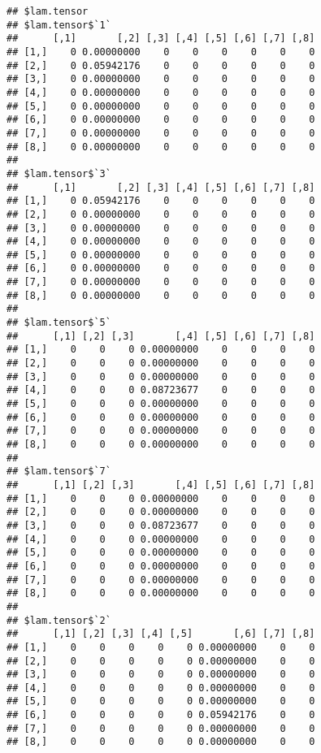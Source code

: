 \documentclass[
]{article}
\begin{document}
\begin{verbatim}
## $lam.tensor
## $lam.tensor$`1`
##      [,1]       [,2] [,3] [,4] [,5] [,6] [,7] [,8]
## [1,]    0 0.00000000    0    0    0    0    0    0
## [2,]    0 0.05942176    0    0    0    0    0    0
## [3,]    0 0.00000000    0    0    0    0    0    0
## [4,]    0 0.00000000    0    0    0    0    0    0
## [5,]    0 0.00000000    0    0    0    0    0    0
## [6,]    0 0.00000000    0    0    0    0    0    0
## [7,]    0 0.00000000    0    0    0    0    0    0
## [8,]    0 0.00000000    0    0    0    0    0    0
## 
## $lam.tensor$`3`
##      [,1]       [,2] [,3] [,4] [,5] [,6] [,7] [,8]
## [1,]    0 0.05942176    0    0    0    0    0    0
## [2,]    0 0.00000000    0    0    0    0    0    0
## [3,]    0 0.00000000    0    0    0    0    0    0
## [4,]    0 0.00000000    0    0    0    0    0    0
## [5,]    0 0.00000000    0    0    0    0    0    0
## [6,]    0 0.00000000    0    0    0    0    0    0
## [7,]    0 0.00000000    0    0    0    0    0    0
## [8,]    0 0.00000000    0    0    0    0    0    0
## 
## $lam.tensor$`5`
##      [,1] [,2] [,3]       [,4] [,5] [,6] [,7] [,8]
## [1,]    0    0    0 0.00000000    0    0    0    0
## [2,]    0    0    0 0.00000000    0    0    0    0
## [3,]    0    0    0 0.00000000    0    0    0    0
## [4,]    0    0    0 0.08723677    0    0    0    0
## [5,]    0    0    0 0.00000000    0    0    0    0
## [6,]    0    0    0 0.00000000    0    0    0    0
## [7,]    0    0    0 0.00000000    0    0    0    0
## [8,]    0    0    0 0.00000000    0    0    0    0
## 
## $lam.tensor$`7`
##      [,1] [,2] [,3]       [,4] [,5] [,6] [,7] [,8]
## [1,]    0    0    0 0.00000000    0    0    0    0
## [2,]    0    0    0 0.00000000    0    0    0    0
## [3,]    0    0    0 0.08723677    0    0    0    0
## [4,]    0    0    0 0.00000000    0    0    0    0
## [5,]    0    0    0 0.00000000    0    0    0    0
## [6,]    0    0    0 0.00000000    0    0    0    0
## [7,]    0    0    0 0.00000000    0    0    0    0
## [8,]    0    0    0 0.00000000    0    0    0    0
## 
## $lam.tensor$`2`
##      [,1] [,2] [,3] [,4] [,5]       [,6] [,7] [,8]
## [1,]    0    0    0    0    0 0.00000000    0    0
## [2,]    0    0    0    0    0 0.00000000    0    0
## [3,]    0    0    0    0    0 0.00000000    0    0
## [4,]    0    0    0    0    0 0.00000000    0    0
## [5,]    0    0    0    0    0 0.00000000    0    0
## [6,]    0    0    0    0    0 0.05942176    0    0
## [7,]    0    0    0    0    0 0.00000000    0    0
## [8,]    0    0    0    0    0 0.00000000    0    0

\end{verbatim}
\end{document}
